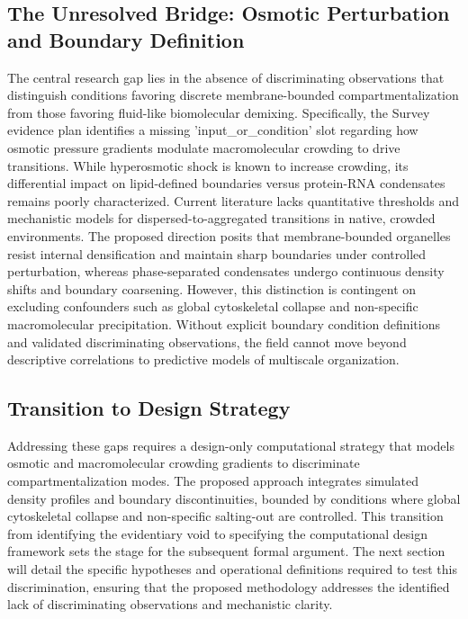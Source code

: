 \documentclass[conference]{IEEEtran}
\begin{document}
\subsection{The Unresolved Bridge: Osmotic Perturbation and Boundary Definition}
The central research gap lies in the absence of discriminating observations that distinguish conditions favoring discrete membrane-bounded compartmentalization from those favoring fluid-like biomolecular demixing. Specifically, the Survey evidence plan identifies a missing 'input\_or\_condition' slot regarding how osmotic pressure gradients modulate macromolecular crowding to drive transitions. While hyperosmotic shock is known to increase crowding, its differential impact on lipid-defined boundaries versus protein-RNA condensates remains poorly characterized. Current literature lacks quantitative thresholds and mechanistic models for dispersed-to-aggregated transitions in native, crowded environments. The proposed direction posits that membrane-bounded organelles resist internal densification and maintain sharp boundaries under controlled perturbation, whereas phase-separated condensates undergo continuous density shifts and boundary coarsening. However, this distinction is contingent on excluding confounders such as global cytoskeletal collapse and non-specific macromolecular precipitation. Without explicit boundary condition definitions and validated discriminating observations, the field cannot move beyond descriptive correlations to predictive models of multiscale organization.~\cite{cite_7161cfcb40366dd0}

\subsection{Transition to Design Strategy}
Addressing these gaps requires a design-only computational strategy that models osmotic and macromolecular crowding gradients to discriminate compartmentalization modes. The proposed approach integrates simulated density profiles and boundary discontinuities, bounded by conditions where global cytoskeletal collapse and non-specific salting-out are controlled. This transition from identifying the evidentiary void to specifying the computational design framework sets the stage for the subsequent formal argument. The next section will detail the specific hypotheses and operational definitions required to test this discrimination, ensuring that the proposed methodology addresses the identified lack of discriminating observations and mechanistic clarity.
\end{document}
